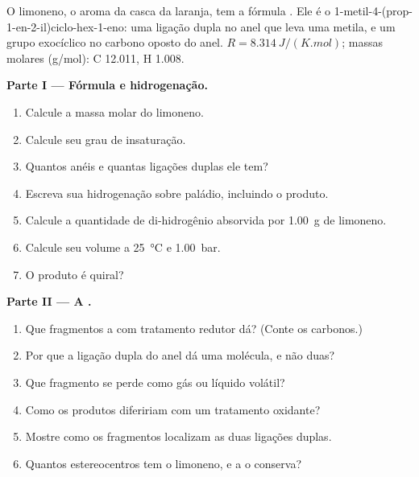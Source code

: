\begin{problem}
\label{pb:b2:alkene-redox:1}
O limoneno, o aroma da casca da laranja, tem a fórmula . Ele é o
1-metil-4-(prop-1-en-2-il)ciclo-hex-1-eno: uma ligação dupla no anel que leva
uma metila, e um grupo exocíclico  no carbono oposto do anel. $R =
\qty{8.314}{J/(K.mol)}$; massas molares (\unit{g/mol}): C 12.011, H 1.008.

\medskip
\noindent\textbf{Parte I --- Fórmula e hidrogenação.}
\begin{enumerate}
  \item Calcule a massa molar do limoneno.
  \item Calcule seu grau de insaturação.
  \item Quantos anéis e quantas ligações duplas ele tem?
  \item Escreva sua hidrogenação sobre paládio, incluindo o produto.
  \item Calcule a quantidade de di-hidrogênio absorvida por \qty{1.00}{g} de limoneno.
  \item Calcule seu volume a \qty{25}{\degreeCelsius} e \qty{1.00}{bar}.
  \item O produto é quiral?
\end{enumerate}

\medskip
\noindent\textbf{Parte II --- A .}
\begin{enumerate}[resume]
  \item Que fragmentos a  com tratamento redutor dá? (Conte os carbonos.)
  \item Por que a ligação dupla do anel dá uma molécula, e não duas?
  \item Que fragmento se perde como gás ou líquido volátil?
  \item Como os produtos difeririam com um tratamento oxidante?
  \item Mostre como os fragmentos localizam as duas ligações duplas.
  \item Quantos estereocentros tem o limoneno, e a  o conserva?
\end{enumerate}


\end{problem}
